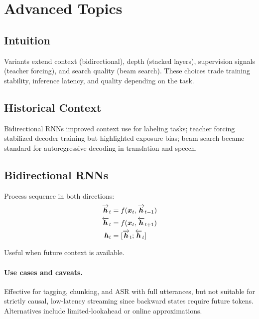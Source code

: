 
\section{Advanced Topics}
\label{sec:rnn-advanced}

\subsection*{Intuition}

Variants extend context (bidirectional), depth (stacked layers), supervision signals (teacher forcing), and search quality (beam search). These choices trade training stability, inference latency, and quality depending on the task.

\subsection*{Historical Context}

Bidirectional RNNs improved context use for labeling tasks; teacher forcing stabilized decoder training but highlighted exposure bias; beam search became standard for autoregressive decoding in translation and speech.


\subsection{Bidirectional RNNs}

Process sequence in both directions:
\begin{align}
\overrightarrow{\boldsymbol{h}}_t &= f(\boldsymbol{x}_t, \overrightarrow{\boldsymbol{h}}_{t-1}) \\
\overleftarrow{\boldsymbol{h}}_t &= f(\boldsymbol{x}_t, \overleftarrow{\boldsymbol{h}}_{t+1}) \\
\boldsymbol{h}_t &= [\overrightarrow{\boldsymbol{h}}_t; \overleftarrow{\boldsymbol{h}}_t]
\end{align}

Useful when future context is available.

\paragraph{Use cases and caveats.} Effective for tagging, chunking, and ASR with full utterances, but not suitable for strictly causal, low-latency streaming since backward states require future tokens. Alternatives include limited-lookahead or online approximations.

